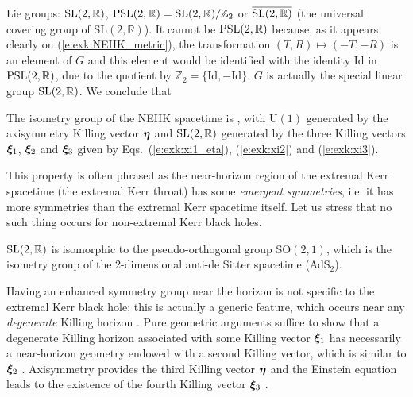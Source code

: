 Lie groups: $\mathrm{SL}(2,\mathbb{R})$, $\mathrm{PSL}(2,\mathbb{R}) = \mathrm{SL}(2,\mathbb{R})/\mathbb{Z}_2$
or $\overline{\mathrm{SL}(2,\mathbb{R})}$
(the universal covering group of $\mathrm{SL}(2, \mathbb{R})$).
It cannot be $\mathrm{PSL}(2,\mathbb{R})$ because, as it appears clearly on (\ref{e:exk:NEHK_metric}),
the transformation $(T,R) \mapsto (-T,-R)$ is an element of $G$ and this element
would be identified with the identity $\mathrm{Id}$ in $\mathrm{PSL}(2,\mathbb{R})$,
due to the quotient by $\mathbb{Z}_2 = \{\mathrm{Id}, -\mathrm{Id}\}$.
$G$ is actually the
special linear group $\mathrm{SL}(2,\mathbb{R})$. We conclude that
\begin{greybox}
The isometry group
of the NEHK spacetime is
\be \label{e:exk:NHEK_isometry_group}
     ,
\ee
with $\mathrm{U}(1)$ generated by the axisymmetry Killing vector $\bm{\eta}$ and
$\mathrm{SL}(2,\mathbb{R})$ generated by the three Killing vectors $\bm{\xi}_1$, $\bm{\xi}_2$ and
$\bm{\xi}_3$ given by Eqs.~(\ref{e:exk:xi1_eta}), (\ref{e:exk:xi2}) and (\ref{e:exk:xi3}).
\end{greybox}

This property is often phrased as the near-horizon region of the extremal
Kerr spacetime (the extremal Kerr throat) has some \emph{emergent symmetries}, i.e. it has
more symmetries than the extremal Kerr spacetime itself.
Let us stress that no such thing occurs for non-extremal Kerr black holes.

\begin{remark}
$\mathrm{SL}(2,\mathbb{R})$ is isomorphic to the pseudo-orthogonal group $\mathrm{SO}(2,1)$, which is the isometry group of
the 2-dimensional anti-de Sitter spacetime (AdS$_2$).
\end{remark}

\begin{remark}
Having an enhanced symmetry group near the horizon is not specific to the
extremal Kerr black hole;
this is actually a generic feature, which occurs near any \emph{degenerate} Killing horizon
\cite{KunduL13,Compe17}.
Pure geometric arguments suffice to show that a degenerate Killing horizon
associated with some Killing vector $\bm{\xi}_1$ has necessarily a near-horizon geometry
endowed with a second Killing vector, which is similar to $\bm{\xi}_2$ \cite{KunduL13}.
Axisymmetry provides the third Killing vector $\bm{\eta}$ and the Einstein equation
leads to the existence of the fourth Killing vector $\bm{\xi}_3$
\cite{KunduLR07}.
\end{remark}

